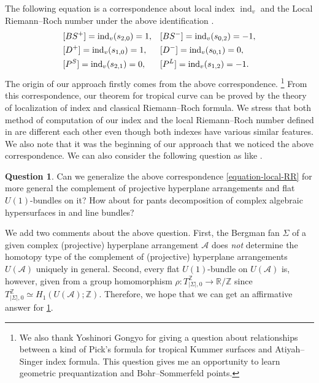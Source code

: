 \documentclass[a4paper,dvipdfmx,reqno,12pt]{amsart}
\theoremstyle{definition}
\newtheorem{question}[theorem]{Question}
\newcommand{\opn}[1]{\operatorname{#1}}
\newcommand{\myfootnote}[1]{\hspace{-5pt}\footnote{#1}}
\numberwithin{equation}{section}
\begin{document}
The following equation is a correspondence about 
local index $\opn{ind}_v$ and the Local 
Riemann--Roch number under the above 
identification \cite[Theorem 6.7]{MR2676658}.
\begin{align} \label{equation-local-RR}
& [BS^{+}]=\opn{ind}_v(s_{2,0})=1, 
&& [BS^{-}]=\opn{ind}_v(s_{0,2})=-1,\notag \\
& [D^{+}]=\opn{ind}_v(s_{1,0})=1,
&& [D^{-}]=\opn{ind}_v(s_{0,1})=0, \\
& [P^{S}]=\opn{ind}_v(s_{2,1})=0,
&& [P^{L}]=\opn{ind}_v(s_{1,2})=-1 \notag.
\end{align}
The origin of our approach firstly comes from the 
above correspondence.
\myfootnote{
We also thank Yoshinori Gongyo for 
giving a question about relationships 
between a kind of Pick's formula for
tropical Kummer surfaces and Atiyah--Singer
index formula. This question gives me 
an opportunity to learn geometric prequantization and
Bohr--Sommerfeld points.
}
From this correspondence, 
our theorem for tropical curve can be 
proved by the theory of localization of index 
and classical Riemann--Roch formula.
We stress that both method of computation
of our index and the local Riemann--Roch number
defined in \cite{MR2676658} are different 
each other even though both indexes have various 
similar features.
We also note that it was the beginning of our 
approach that we 
noticed the above correspondence.
We can also consider the following question as 
like \cite{auroux2022lagrangian}.

\begin{question} \label{question-tropical-complex-rr}
Can we generalize the 
above correspondence \ref{equation-local-RR}
for more general the complement of
projective hyperplane arrangements and flat $U(1)$-bundles on it?
How about for pants decomposition of
  complex algebraic hypersurfaces in \cite{MR2079993} and line bundles?
\end{question}

We add two comments about the above question. 
First, the Bergman fan $\Sigma$ of a given complex 
(projective) hyperplane arrangement $\mathcal{A}$ does \emph{not} 
determine 
the homotopy type of the complement of (projective) 
hyperplane
arrangements $U(\mathcal{A})$ uniquely in general.
Second, every flat $U(1)$-bundle on 
$U(\mathcal{A})$ is, 
however, given
from a group homomorphism 
$\rho\colon T_{|\Sigma|,0}^{\mathbb{Z}}\to 
\mathbb{R}/\mathbb{Z}$ since 
$T_{|\Sigma|,0}^{\mathbb{Z}}\simeq 
H_1(U(\mathcal{A});\mathbb{Z})$.
Therefore, we hope that we can get an affirmative answer 
for \cref{question-tropical-complex-rr}.
\end{document}
